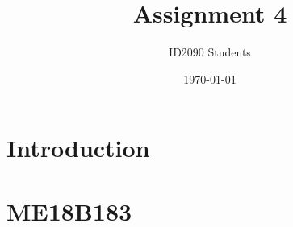 \documentclass[a4paper, 12pt]{article}
\begin{document}
\title{Assignment 4}
\author{ID2090 Students}
\date{\today}
\maketitle

\tableofcontents

\section{Introduction}

\section{ME18B183}

\end{document}
